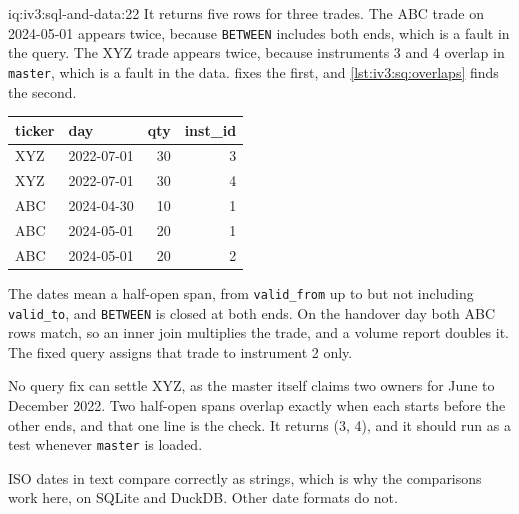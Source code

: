 \begin{solution}{iq:iv3:sql-and-data:22}
It returns five rows for three trades. The ABC trade on 2024-05-01 appears twice, because \texttt{BETWEEN} includes both ends, which is a fault in the query. The XYZ trade appears twice, because instruments 3 and 4 overlap in \texttt{master}, which is a fault in the data.  fixes the first, and \cref{lst:iv3:sq:overlaps} finds the second.
\begin{center}\small
\begin{tabular}{llrr}
ticker & day & qty & inst\_id\\\hline
XYZ & 2022-07-01 & 30 & 3\\
XYZ & 2022-07-01 & 30 & 4\\
ABC & 2024-04-30 & 10 & 1\\
ABC & 2024-05-01 & 20 & 1\\
ABC & 2024-05-01 & 20 & 2
\end{tabular}
\end{center}
\label{lst:iv3:sq:pitfixed}
\label{lst:iv3:sq:overlaps}

The dates mean a half-open span, from \texttt{valid\_from} up to but not including \texttt{valid\_to}, and \texttt{BETWEEN} is closed at both ends. On the handover day both ABC rows match, so an inner join multiplies the trade, and a volume report doubles it. The fixed query assigns that trade to instrument 2 only.

No query fix can settle XYZ, as the master itself claims two owners for June to December 2022. Two half-open spans overlap exactly when each starts before the other ends, and that one line is the check. It returns (3, 4), and it should run as a test whenever \texttt{master} is loaded.

ISO dates in text compare correctly as strings, which is why the comparisons work here, on SQLite and DuckDB. Other date formats do not.

\end{solution}

